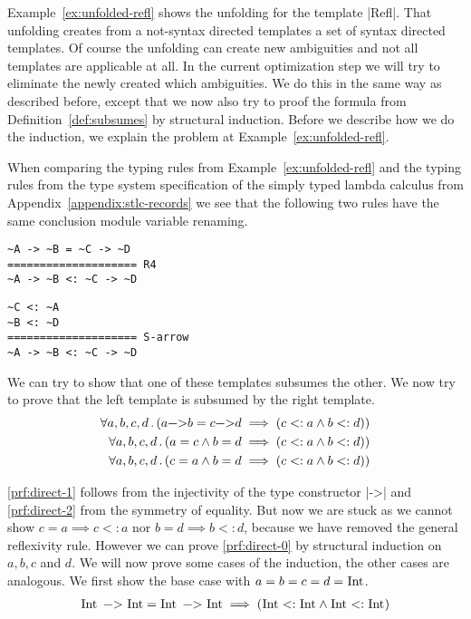 Example~\ref{ex:unfolded-refl} shows the unfolding for the template
\code|Refl|. That unfolding creates from a not-syntax directed
templates a set of syntax directed templates. Of course the unfolding
can create new ambiguities and not all templates are applicable at
all. In the current optimization step we will try to eliminate the
newly created which ambiguities. We do this in the same way as
described before, except that we now also try to proof the formula
from Definition~\ref{def:subsumes} by structural induction. Before we
describe how we do the induction, we explain the problem at
Example~\ref{ex:unfolded-refl}.

When comparing the typing rules from Example~\ref{ex:unfolded-refl}
and the typing rules from the type system specification of the simply
typed lambda calculus from Appendix~\ref{appendix:stlc-records} we see
that the following two rules have the same conclusion module variable
renaming.

\begin{minipage}[b]{.4\linewidth}
\begin{lstlisting}[language=sltc]
~A -> ~B = ~C -> ~D
==================== R4
~A -> ~B <: ~C -> ~D
\end{lstlisting}
\end{minipage}
\begin{minipage}[b]{.5\linewidth}
\begin{lstlisting}[language=sltc]
~C <: ~A
~B <: ~D
==================== S-arrow 
~A -> ~B <: ~C -> ~D
\end{lstlisting}
\end{minipage}

We can try to show that one of these templates subsumes the other. We
now try to prove that the left template is subsumed by the right
template.
\begin{align}
  \forall a,b,c,d \,.\, (a \text{\code|->|} b = c \text{\code|->|} d \implies (c <:
  a \land b <: d)) \label{prf:direct-0} \\
  \forall a,b,c,d \,.\, (a = c \land b = d \implies (c <: a \land b <:
  d)) \label{prf:direct-1}\\
 \forall a,b,c,d \,.\, (c = a \land b = d \implies (c <: a \land b <:
 d)) \label{prf:direct-2}
\end{align}

\ref{prf:direct-1} follows from the injectivity of the type
constructor \code|->| and \ref{prf:direct-2} from the symmetry of
equality. But now we are stuck as we cannot show $c = a \implies c <:
a$ nor $b = d \implies b <: d$, because we have removed the general
reflexivity rule. However we can prove \ref{prf:direct-0} by
structural induction on $a, b, c$ and $d$. We will now prove some
cases of the induction, the other cases are analogous. We first show
the base case with $a = b = c = d = \text{\code|Int|}$.
\begin{align}
  \text{\code|Int -> Int|} = \text{\code|Int -> Int|} \implies
  (\text{\code|Int|} <: \text{\code|Int|} \land \text{\code|Int|} <:
  \text{\code|Int|}) \label{prf:induction-base}
\end{align}

